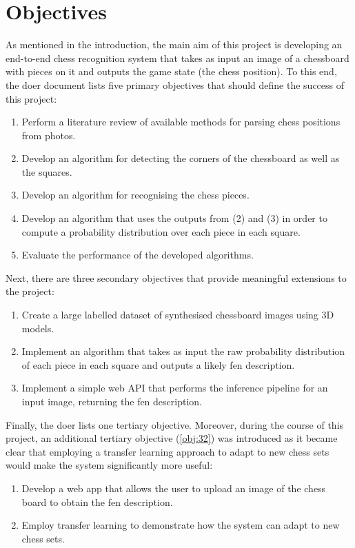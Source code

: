 \section{Objectives}
\label{sec:objectives}
As mentioned in the introduction, the main aim of this project is developing an end-to-end chess recognition system that takes as input an image of a chessboard with pieces on it and outputs the game state (the chess position).
To this end, the \gls{doer} document lists five primary objectives that should define the success of this project:
\begin{enumerate}[label={A\arabic*.},ref={A\arabic*}]
    \item \label{obj:11} Perform a literature review of available methods for parsing chess positions from photos.
    \item \label{obj:12} Develop an algorithm for detecting the corners of the chessboard as well as the squares.
    \item \label{obj:13} Develop an algorithm for recognising the chess pieces.
    \item \label{obj:14} Develop an algorithm that uses the outputs from (2) and (3) in order to compute a probability distribution over each piece in each square.
    \item \label{obj:15} Evaluate the performance of the developed algorithms.
\end{enumerate}

Next, there are three secondary objectives that provide meaningful extensions to the project:
\begin{enumerate}[label={B\arabic*.},ref={B\arabic*}]
    \item \label{obj:21} Create a large labelled dataset of synthesised chessboard images using 3D models.
    \item \label{obj:22} Implement an algorithm that takes as input the raw probability distribution of each piece in each square and outputs a likely \gls{fen} description.
    \item \label{obj:23} Implement a simple web API that performs the inference pipeline for an input image, returning the \gls{fen} description. 
\end{enumerate}

Finally, the \gls{doer} lists one tertiary objective. 
Moreover, during the course of this project, an additional tertiary objective (\ref{obj:32}) was introduced as it became clear that employing a transfer learning approach to adapt to new chess sets would make the system significantly more useful:
\begin{enumerate}[label={C\arabic*.},ref={C\arabic*}]
    \item \label{obj:31} Develop a web app that allows the user to upload an image of the chess board to obtain the \gls{fen} description.
    \item \label{obj:32} Employ transfer learning to demonstrate how the system can adapt to new chess sets.
\end{enumerate}

